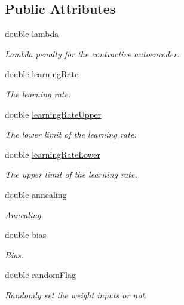 \subsection*{Public Attributes}
\begin{DoxyCompactItemize}
\item 
double \hyperlink{classParamsInit_a7f0aab2366101f688a811824b60c1cc9}{lambda}
\begin{DoxyCompactList}\small\item\em Lambda penalty for the contractive autoencoder. \end{DoxyCompactList}\item 
double \hyperlink{classParamsInit_a357170aa7b277285467a6a5c8e073a9c}{learning\+Rate}
\begin{DoxyCompactList}\small\item\em The learning rate. \end{DoxyCompactList}\item 
double \hyperlink{classParamsInit_ae6e008da84ddff1c1114eb2e196f3801}{learning\+Rate\+Upper}
\begin{DoxyCompactList}\small\item\em The lower limit of the learning rate. \end{DoxyCompactList}\item 
double \hyperlink{classParamsInit_a5d17698322bd5df72c2040594810e6b0}{learning\+Rate\+Lower}
\begin{DoxyCompactList}\small\item\em The upper limit of the learning rate. \end{DoxyCompactList}\item 
double \hyperlink{classParamsInit_add858efe10c28c501be79318a041811e}{annealing}
\begin{DoxyCompactList}\small\item\em Annealing. \end{DoxyCompactList}\item 
double \hyperlink{classParamsInit_a31710ca6cd4d0d80f994b45554ba00b0}{bias}
\begin{DoxyCompactList}\small\item\em Bias. \end{DoxyCompactList}\item 
double \hyperlink{classParamsInit_a5583548cf1c2400d0e6260fc5f757957}{random\+Flag}
\begin{DoxyCompactList}\small\item\em Randomly set the weight inputs or not. \end{DoxyCompactList}\item 

\end{DoxyCompactItemize}

